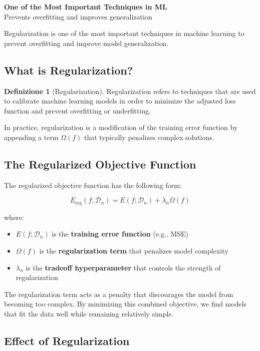 \documentclass[11pt,a4paper]{article}
\theoremstyle{definition}
\newtheorem{definition}{Definizione}[section]
\theoremstyle{plain}
\theoremstyle{remark}
\begin{document}
\begin{center}
\colorbox{green!15}{\parbox{0.85\textwidth}{
\centering
\textbf{One of the Most Important Techniques in ML}\\[0.1cm]
Prevents overfitting and improves generalization
}}
\end{center}

Regularization is one of the most important techniques in machine learning to prevent overfitting and improve model generalization.

\subsection{What is Regularization?}

\begin{definition}[Regularization]
Regularization refers to techniques that are used to calibrate machine learning models in order to minimize the adjusted loss function and prevent overfitting or underfitting.
\end{definition}

In practice, regularization is a modification of the training error function by appending a term $\Omega(f)$ that typically penalizes complex solutions.

\subsection{The Regularized Objective Function}

The regularized objective function has the following form:

\[
E_{\text{reg}}(f; \mathcal{D}_n) = E(f; \mathcal{D}_n) + \lambda_n \Omega(f)
\]

where:
\begin{itemize}
    \item $E(f; \mathcal{D}_n)$ is the \textbf{training error function} (e.g., MSE)
    \item $\Omega(f)$ is the \textbf{regularization term} that penalizes model complexity
    \item $\lambda_n$ is the \textbf{tradeoff hyperparameter} that controls the strength of regularization
\end{itemize}

The regularization term acts as a penalty that discourages the model from becoming too complex. By minimizing this combined objective, we find models that fit the data well while remaining relatively simple.

\subsection{Effect of Regularization}
\end{document}
